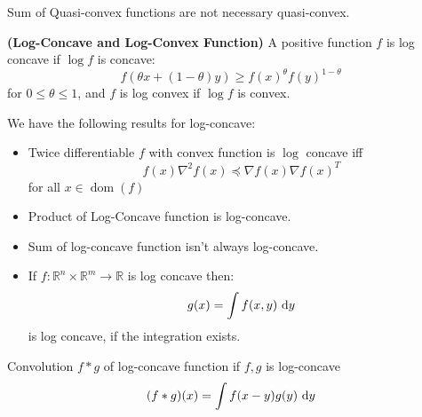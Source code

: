 \begin{remark}
    Sum of Quasi-convex functions are not necessary quasi-convex.
\end{remark}

\begin{definition}{\textbf{(Log-Concave and Log-Convex Function)}}
    A positive function $f$ is log concave if $\log f$ is concave:
    \begin{equation*}
        f(\theta x + (1-\theta)y)\ge f(x)^\theta f(y)^{1-\theta}
    \end{equation*}
    for $0\le\theta\le1$, and $f$ is log convex if $\log f$ is convex. 
\end{definition}

\begin{proposition}
    We have the following results for log-concave:
    \begin{itemize}
        \item Twice differentiable $f$ with convex function is $\log$ concave iff 
        \begin{equation*}
            f(x)\nabla^2 f(x) \preceq \nabla f(x)\nabla f(x)^T
        \end{equation*}
        for all $x\in\operatorname{dom}(f)$
        \item Product of Log-Concave function is log-concave. 
        \item Sum of log-concave function isn't always log-concave.
        \item If $f:\mathbb{R}^n\times \mathbb{R}^m\rightarrow \mathbb{R}$ is log concave then:
        \begin{equation*}
            g(x) = \int f(x, y)\ \mathrm{d} y
        \end{equation*}
        is log concave, if the integration exists.
    \end{itemize}
\end{proposition}

\begin{proposition}
    Convolution $f*g$ of log-concave function if $f, g$ is log-concave 
    \begin{equation*}
        (f*g)(x) = \int f(x-y)g(y)\ \mathrm{d} y
    \end{equation*}
\end{proposition}

